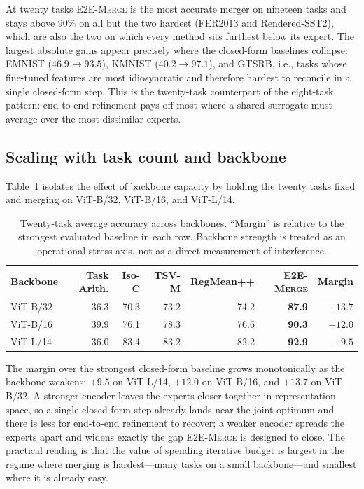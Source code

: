 \documentclass[letterpaper]{article} %
\newcommand{\method}{\textup{\textsc{E2E-Merge}}\xspace}
\theoremstyle{plain}
\theoremstyle{definition}
\begin{document}
At twenty tasks \method is the most accurate merger on nineteen tasks and stays above $90\%$ on all but the two hardest (FER2013 and Rendered-SST2), which are also the two on which every method sits furthest below its expert.
The largest absolute gains appear precisely where the closed-form baselines collapse: EMNIST ($46.9\!\to\!93.5$), KMNIST ($40.2\!\to\!97.1$), and GTSRB, i.e., tasks whose fine-tuned features are most idiosyncratic and therefore hardest to reconcile in a single closed-form step.
This is the twenty-task counterpart of the eight-task pattern: end-to-end refinement pays off most where a shared surrogate must average over the most dissimilar experts.

\subsection{Scaling with task count and backbone}
\label{app:scaling}
Table~\ref{tab:backbone-scaling} isolates the effect of backbone capacity by holding the twenty tasks fixed and merging on ViT-B/32, ViT-B/16, and ViT-L/14.


\begin{table}[tb]
\centering
{\small
\begin{tabular}{lrrrrrr}
\toprule
Backbone & Task Arith. & Iso-C & TSV-M & RegMean++ & \method & Margin \\
\midrule
ViT-B/32 & 36.3 & 70.3 & 73.2 & 74.2 & \textbf{87.9} & $+13.7$ \\
ViT-B/16 & 39.9 & 76.1 & 78.3 & 76.6 & \textbf{90.3} & $+12.0$ \\
ViT-L/14 & 36.0 & 83.4 & 83.2 & 82.2 & \textbf{92.9} & $+9.5$ \\
\bottomrule
\end{tabular}
}
\caption{Twenty-task average accuracy across backbones. ``Margin'' is relative to the
strongest evaluated baseline in each row.
Backbone strength is treated as an operational stress axis, not as a direct measurement of interference.}
\label{tab:backbone-scaling}
\end{table}

The margin over the strongest closed-form baseline grows monotonically as the backbone weakens: $+9.5$ on ViT-L/14, $+12.0$ on ViT-B/16, and $+13.7$ on ViT-B/32.
A stronger encoder leaves the experts closer together in representation space, so a single closed-form step already lands near the joint optimum and there is less for end-to-end refinement to recover; a weaker encoder spreads the experts apart and widens exactly the gap \method is designed to close.
The practical reading is that the value of spending iterative budget is largest in the regime where merging is hardest---many tasks on a small backbone---and smallest where it is already easy.
\end{document}
